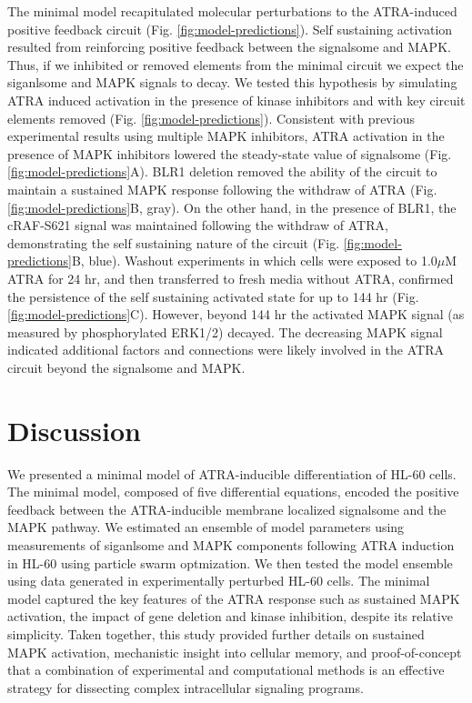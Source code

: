 \documentclass[10pt,twocolumn,twoside,final]{IEEEtran}
\begin{document}
The minimal model recapitulated molecular perturbations to the ATRA-induced positive feedback circuit (Fig. \ref{fig:model-predictions}).
Self sustaining activation resulted from reinforcing positive feedback between the signalsome and MAPK.
Thus, if we inhibited or removed elements from the minimal circuit we expect the siganlsome and MAPK signals to decay.
We tested this hypothesis by simulating ATRA induced activation in the presence of kinase inhibitors and with key circuit elements removed (Fig. \ref{fig:model-predictions}).
Consistent with previous experimental results using multiple MAPK inhibitors, ATRA activation in the presence of MAPK inhibitors lowered the steady-state value of signalsome (Fig. \ref{fig:model-predictions}A). BLR1 deletion removed the ability of the circuit to maintain a sustained MAPK response following the withdraw of ATRA (Fig. \ref{fig:model-predictions}B, gray). On the other hand, in the presence of BLR1, the cRAF-S621 signal was maintained following the withdraw of ATRA, demonstrating the self sustaining nature of the circuit (Fig. \ref{fig:model-predictions}B, blue). Washout experiments in which cells were exposed to 1.0$\mu$M ATRA for 24 hr, and then transferred to fresh media without ATRA, confirmed the persistence of the self sustaining activated state for up to 144 hr (Fig. \ref{fig:model-predictions}C). However, beyond 144 hr the activated MAPK signal (as measured by phosphorylated ERK1/2) decayed. The decreasing MAPK signal indicated additional factors and connections were likely involved in the ATRA circuit beyond the signalsome and MAPK.

\section{Discussion}
We presented a minimal model of ATRA-inducible differentiation of HL-60 cells.
The minimal model, composed of five differential equations, encoded the positive feedback between the ATRA-inducible
membrane localized signalsome and the MAPK pathway.
We estimated an ensemble of model parameters using measurements of siganlsome and MAPK components following ATRA induction in HL-60 using particle swarm optmization.
We then tested the model ensemble using data generated in experimentally perturbed HL-60 cells.
The minimal model captured the key features of the ATRA response such as
sustained MAPK activation, the impact of gene deletion and kinase inhibition, despite its relative simplicity.
Taken together, this study provided further details on sustained MAPK activation, mechanistic insight into cellular memory,
and proof-of-concept that a combination of experimental and computational methods is an effective strategy for dissecting complex intracellular signaling programs.
\end{document}
